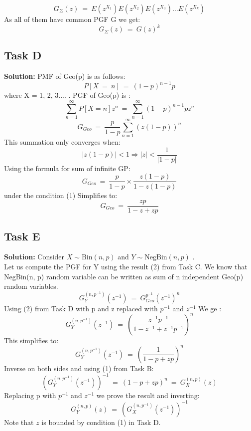 \documentclass[12pt]{article}
\begin{document}
\[G_{\Sigma}(z)\ =\ E(z^{X_1})E(z^{X_2})E(z^{X_3})\dots E(z^{X_k})\]
As all of them have common PGF G we get:
\begin{equation}
    G_{\Sigma}(z)\ =\ G(z)^k
\end{equation}

\subsection{Task D}
\textbf{Solution: } \newline
PMF of Geo(p) is as follows:
\[P[X\ =\ n]\ =\ (1-p)^{n-1}p\]
where X = {1, 2, 3....} . PGF of Geo(p) is :
\[\sum_{n=1}^{\infty}P[X=n]z^n\ =\ \sum_{n=1}^{\infty}(1-p)^{n-1}pz^n\]
\[G_{Geo}\ =\ \frac{p}{1-p}\sum_{n=1}^{\infty}(z(1-p))^n\]
This summation only converges when:
\begin{equation}
    |z(1-p)|<1 \Rightarrow |z|<\frac{1}{|1-p|}
\end{equation}
Using the formula for sum of infinite GP:
\[G_{Geo}\ =\ \frac{p}{1-p}\times\frac{z(1-p)}{1-z(1-p)}\]
under the condition (1) Simplifies to:
\begin{equation}
    G_{Geo}\ =\ \frac{zp}{1-z+zp}
\end{equation}

\subsection{Task E}
\textbf{Solution: } \newline
Consider $X \sim \text{Bin}(n, p)$ and $Y \sim \text{NegBin}(n, p)$ .\\
Let us compute the PGF for Y using the result (2) from Task C. We know that NegBin(n, p) random variable can be written as sum of n independent Geo(p) random variables.
\[G_{Y}^{(n,p^{-1})}(z^{-1})\ =\ G_{Geo}^{p^{-1}}(z^{-1})^{n}\]
Using (2) from Task D with p and z replaced with $p^{-1}$ and $z^{-1}$ We ge :
\[G_{Y}^{(n,p^{-1})}(z^{-1})\ =\ \left(\frac{z^{-1}p^{-1}}{1-z^{-1}+z^{-1}p^{-1}}\right)^{n}\]
This simplifies to:
\[G_{Y}^{(n,p^{-1})}(z^{-1})\ =\ \left(\frac{1}{1-p+zp}\right)^{n}\]
Inverse on both sides and using (1) from Task B:
\[\left(G_{Y}^{(n,p^{-1})}(z^{-1})\right)^{-1}\ =\ (1-p+zp)^n\ =\ G_{X}^{(n,p)}(z)\]
Replacing p with $p^{-1}$ and $z^{-1}$ we prove the result and inverting:
\begin{equation}
    G_{Y}^{(n,p)}(z)\ =\ \left(G_{X}^{(n,p^{-1})}(z^{-1})\right)^{-1}
\end{equation}
Note that $z$ is bounded by condition (1) in Task D.
\end{document}

